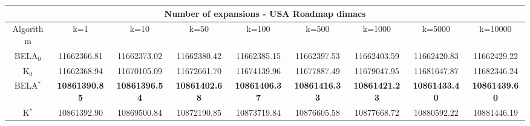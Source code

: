 \begin{tabular}{c|cccccccc}\toprule
\multicolumn{9}{c}{Number of expansions - USA Roadmap dimacs}\\ \midrule
Algorithm & k=1 & k=10 & k=50 & k=100 & k=500 & k=1000 & k=5000 & k=10000 \\ \midrule
BELA$_0$ & 11662366.81 & 11662373.02 & 11662380.42 & 11662385.15 & 11662397.53 & 11662403.59 & 11662420.83 & 11662429.22 \\
K$_0$ & 11662368.94 & 11670105.09 & 11672661.70 & 11674139.96 & 11677887.49 & 11679047.95 & 11681647.87 & 11682346.24 \\
BELA$^*$ & \textbf{10861390.85} & \textbf{10861396.54} & \textbf{10861402.68} & \textbf{10861406.37} & \textbf{10861416.33} & \textbf{10861421.23} & \textbf{10861433.40} & \textbf{10861439.60} \\
K$^*$ & 10861392.90 & 10869500.84 & 10872190.85 & 10873719.84 & 10876605.58 & 10877668.72 & 10880592.22 & 10881446.19 \\ \bottomrule 
\end{tabular}
